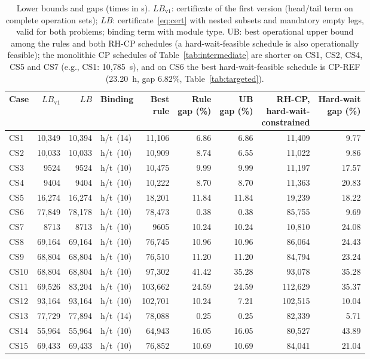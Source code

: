 \begin{table}[tbp]
\caption{Lower bounds and gaps (times in s). $LB_{\mathrm{v1}}$: certificate of the first version (head/tail term on complete operation sets); $LB$: certificate~\eqref{eq:cert} with nested subsets and mandatory empty legs, valid for both problems; binding term with module type. UB: best operational upper bound among the rules and both RH-CP schedules (a hard-wait-feasible schedule is also operationally feasible); the monolithic CP schedules of Table~\ref{tab:intermediate} are shorter on CS1, CS2, CS4, CS5 and CS7 (e.g., CS1: 10,785~s), and on CS6 the best hard-wait-feasible schedule is CP-REF (23.20~h, gap 6.82\%, Table~\ref{tab:targeted}).\label{tab:gaps}}
\centering
\footnotesize
\setlength{\tabcolsep}{3pt}
\begin{tabular*}{\textwidth}{@{\extracolsep{\fill}}lrrlrrrrr@{}}
\toprule
Case & $LB_{\mathrm{v1}}$ & $LB$ & Binding & \shortstack{Best\\rule} & \shortstack{Rule\\gap (\%)} & \shortstack{UB\\gap (\%)} & \shortstack{RH-CP,\\hard-wait-\\constrained} & \shortstack{Hard-wait\\gap (\%)}\\
\midrule
CS1 & 10,349 & 10,394 & h/t~(14) & 11,106 & 6.86 & 6.86 & 11,409 & 9.77\\
CS2 & 10,033 & 10,033 & h/t~(10) & 10,909 & 8.74 & 6.55 & 11,022 & 9.86\\
CS3 & 9524 & 9524 & h/t~(10) & 10,475 & 9.99 & 9.99 & 11,197 & 17.57\\
CS4 & 9404 & 9404 & h/t~(10) & 10,222 & 8.70 & 8.70 & 11,363 & 20.83\\
CS5 & 16,274 & 16,274 & h/t~(10) & 18,201 & 11.84 & 11.84 & 19,239 & 18.22\\
CS6 & 77,849 & 78,178 & h/t~(10) & 78,473 & 0.38 & 0.38 & 85,755 & 9.69\\
CS7 & 8713 & 8713 & h/t~(10) & 9605 & 10.24 & 10.24 & 10,810 & 24.08\\
CS8 & 69,164 & 69,164 & h/t~(10) & 76,745 & 10.96 & 10.96 & 86,064 & 24.43\\
CS9 & 68,804 & 68,804 & h/t~(10) & 76,510 & 11.20 & 11.20 & 84,794 & 23.24\\
CS10 & 68,804 & 68,804 & h/t~(10) & 97,302 & 41.42 & 35.28 & 93,078 & 35.28\\
CS11 & 69,526 & 83,204 & h/t~(10) & 103,662 & 24.59 & 24.59 & 112,629 & 35.37\\
CS12 & 93,164 & 93,164 & h/t~(10) & 102,701 & 10.24 & 7.21 & 102,515 & 10.04\\
CS13 & 77,729 & 77,894 & h/t~(14) & 78,088 & 0.25 & 0.25 & 82,339 & 5.71\\
CS14 & 55,964 & 55,964 & h/t~(10) & 64,943 & 16.05 & 16.05 & 80,527 & 43.89\\
CS15 & 69,433 & 69,433 & h/t~(10) & 76,852 & 10.69 & 10.69 & 84,041 & 21.04\\
\bottomrule
\end{tabular*}
\end{table}
